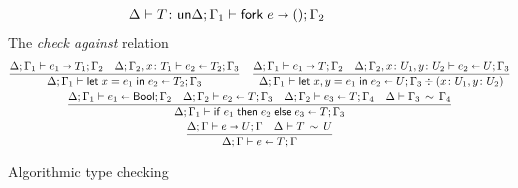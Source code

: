 \begin{figure}[h!]
\begin{gather*}
{    \quad
    \isUn T
  }{
    \algtypeout[\kindEnv;\varEnv_1]{\forke{e}}{\unite}{\varEnv_2}
  }
  \end{gather*}
  The \emph{check against} relation\hfill{}
  \begin{gather*}
    \frac{
      \algtypeout[\kindEnv;\varEnv_1]{e_1}{T_1}{\varEnv_2}
      \quad
      \algtypein[\kindEnv;\varEnv_2,x\colon T_1]{e_2}{T_2}{\Gamma_3}
    }{
      \algtypein[\kindEnv;\varEnv_1]{\unlete{x}{e_1}{e_2}}{T_2}{\varEnv_3}
    }
    \quad
    \frac{
      \algtypeout[\kindEnv ; \varEnv_1]{e_1}{T}{\varEnv_2}
      \quad
      \algtypein[\kindEnv; \varEnv_2, x\colon U_1, y\colon U_2]{e_2}{U}{\varEnv_3}
    }{
      \algtypein[\kindEnv;
      \varEnv_1]{\binlete{x}{y}{e_1}{e_2}}{U}{\varEnv_3} \div (x\colon U_1, y\colon U_2)
    }
    \\
    \frac{
      \algtypein[\kindEnv;\varEnv_1]{e_1}{\boole}{\varEnv_2}
      \quad
      \algtypein[\kindEnv;\varEnv_2]{e_2}{T}{\varEnv_3}
      \quad
      \algtypein[\kindEnv;\varEnv_2]{e_3}{T}{\varEnv_4}
      \quad
      \ctxequiv{\varEnv_3}{\varEnv_4}
    }{
      \algtypein[\kindEnv;\varEnv_1]{\conditionale{e_1}{e_2}{e_3}}{T}{\varEnv_3}
    }
    \\
        \frac{
      \algtypeout e U \varEnv
      \quad
      \typeequiv T U
    }{
      \algtypein e T \varEnv
    }
  \end{gather*}
  \caption{Algorithmic type checking}
  \label{fig:alg-typing}
\end{figure}

